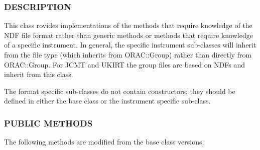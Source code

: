 \subsubsection*{DESCRIPTION\label{ORAC::Group::NDF_DESCRIPTION}}

This class rovides implementations of the methods that require
knowledge of the NDF file format rather than generic methods or
methods that require knowledge of a specific instrument.  In general,
the specific instrument sub-classes will inherit from the file type
(which inherits from ORAC::Group) rather than directly from
ORAC::Group. For JCMT and UKIRT the group files are based on NDFs and
inherit from this class.



The format specific sub-classes do not contain constructors; they 
should be defined in either the base class or the instrument specific
sub-class.

\subsubsection*{PUBLIC METHODS\label{ORAC::Group::NDF_PUBLIC_METHODS}}

The following methods are modified from the base class versions.

